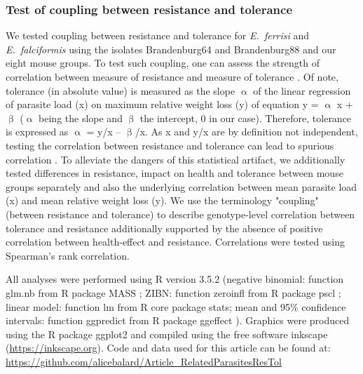 \subsubsection{Test of coupling between resistance and tolerance}

We tested coupling between resistance and tolerance for \textit{E.~ferrisi} and \textit{E.~falciformis }using the isolates Brandenburg64 and Brandenburg88 and our eight mouse groups. To test such coupling, one can assess the strength of correlation between measure of resistance and measure of tolerance \citep{raaberg_disentangling_2007}. Of note, tolerance (in absolute value) is measured as the slope $\upalpha$ of the linear regression of parasite load (x) on maximum relative weight loss (y) of equation y = $\upalpha$ x + $\upbeta$ ($\upalpha$ being the slope and $\upbeta$ the intercept, 0 in our case). Therefore, tolerance is expressed as $\upalpha$ = y/x – $\upbeta$/x. As x and y/x are by definition not independent, testing the correlation between resistance and tolerance can lead to spurious correlation \citep{Brett2004}. To alleviate the dangers of this statistical artifact, we additionally tested differences in resistance, impact on health and tolerance between mouse groups separately and also the underlying correlation between mean parasite load (x) and mean relative weight loss (y). We use the terminology "coupling" (between resistance and tolerance) to describe genotype-level correlation between tolerance and resistance additionally supported by the absence of positive correlation between health-effect and resistance. Correlations were tested using Spearman’s rank correlation.\par

All analyses were performed using R version 3.5.2 \citep{R_2010}(negative binomial: function glm.nb from R package MASS \citep{venables_modern_2002}; ZIBN: function zeroinfl from R package pscl \citep{Jackman2020, Zeileis2008}; linear model: function lm from R core package stats; mean and 95\% confidence intervals: function ggpredict from R package ggeffect \citep{Ldecke2018}). Graphics were prod\textcolor[HTML]{00000A}{uced using the R package ggplot2 \citep{wickham_ggplot2_2016} and compiled using the free software inkscape (\href{https://inkscape.org/}{https://inkscape.org}). Code and data used for this article can be found at: \href{https://github.com/alicebalard/Article_RelatedParasitesResTol}{https://github.com/alicebalard/Article\_RelatedParasitesResTol}}\par


